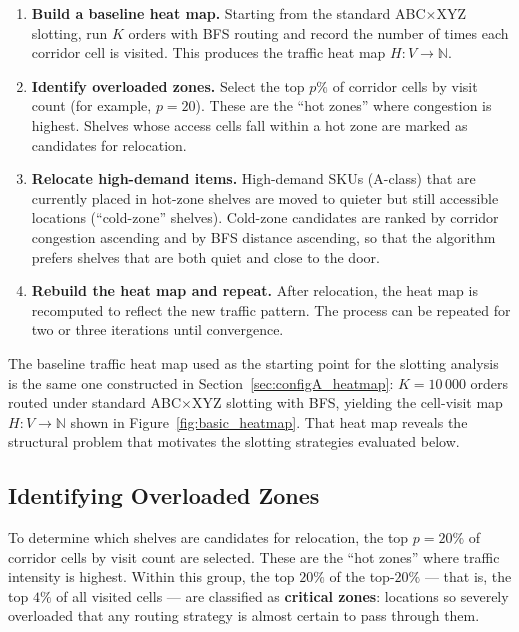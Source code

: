 \documentclass[12pt,a4paper]{article}
\begin{document}
\begin{enumerate}
  \item \textbf{Build a baseline heat map.} Starting from the standard
    ABC$\times$XYZ slotting, run $K$ orders with BFS routing and record
    the number of times each corridor cell is visited. This produces the
    traffic heat map $H : V \to \mathbb{N}$.

  \item \textbf{Identify overloaded zones.} Select the top $p\%$ of corridor
    cells by visit count (for example, $p = 20$). These are the ``hot zones''
    where congestion is highest. Shelves whose access cells fall within a hot
    zone are marked as candidates for relocation.

  \item \textbf{Relocate high-demand items.} High-demand SKUs (A-class) that
    are currently placed in hot-zone shelves are moved to quieter but still
    accessible locations (``cold-zone'' shelves). Cold-zone candidates are ranked
    by corridor congestion ascending and by BFS distance ascending, so that the
    algorithm prefers shelves that are both quiet and close to the door.

  \item \textbf{Rebuild the heat map and repeat.} After relocation, the heat map
    is recomputed to reflect the new traffic pattern. The process can be repeated
    for two or three iterations until convergence.
\end{enumerate}


The baseline traffic heat map used as the starting point for the slotting analysis
is the same one constructed in Section~\ref{sec:configA_heatmap}: $K = 10\,000$
orders routed under standard ABC$\times$XYZ slotting with BFS, yielding
the cell-visit map $H : V \to \mathbb{N}$ shown in Figure~\ref{fig:basic_heatmap}.
That heat map reveals the structural problem that motivates the slotting
strategies evaluated below.

\subsection{Identifying Overloaded Zones}

To determine which shelves are candidates for relocation, the top $p = 20\%$ of
corridor cells by visit count are selected. These are the ``hot zones'' where traffic
intensity is highest. Within this group, the top $20\%$ of the top-$20\%$ --- that
is, the top $4\%$ of all visited cells --- are classified as \textbf{critical zones}:
locations so severely overloaded that any routing strategy is almost certain to pass
through them.
\end{document}
